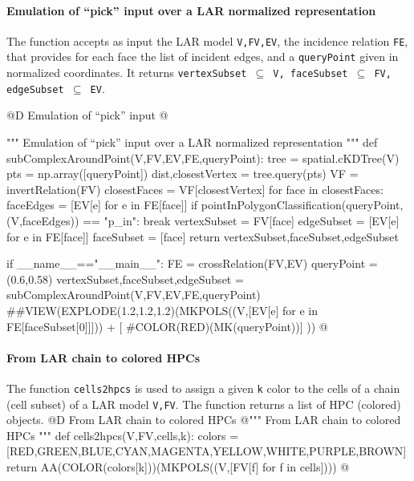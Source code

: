 \documentclass[11pt,oneside]{article}    %
\begin{document}
\paragraph{Emulation of  ``pick'' input over a LAR normalized representation}
The function accepts as input the LAR model \texttt{V,FV,EV}, the incidence relation \texttt{FE}, that provides for each face the list of incident edges, and a \texttt{queryPoint} given in normalized coordinates. It returns \texttt{vertexSubset $\subseteq$ V, faceSubset $\subseteq$ FV, edgeSubset $\subseteq$ EV}.

@D Emulation of ``pick'' input 
@{""" Emulation of  ``pick'' input over a LAR normalized representation """
def subComplexAroundPoint(V,FV,EV,FE,queryPoint):
    tree = spatial.cKDTree(V)
    pts = np.array([queryPoint])
    dist,closestVertex = tree.query(pts)
    VF = invertRelation(FV)
    closestFaces = VF[closestVertex]
    for face in closestFaces:
        faceEdges = [EV[e] for e in FE[face]]
        if pointInPolygonClassification(queryPoint, (V,faceEdges)) == "p_in":
            break
    vertexSubset = FV[face]
    edgeSubset = [EV[e] for e in FE[face]]
    faceSubset = [face]
    return vertexSubset,faceSubset,edgeSubset

if __name__=="__main__":
    FE = crossRelation(FV,EV)
    queryPoint = (0.6,0.58)
    vertexSubset,faceSubset,edgeSubset = subComplexAroundPoint(V,FV,EV,FE,queryPoint)
    ##VIEW(EXPLODE(1.2,1.2,1.2)(MKPOLS((V,[EV[e] for e in FE[faceSubset[0]]])) + [
        #COLOR(RED)(MK(queryPoint))] ))
@}



\paragraph{From LAR chain to colored HPCs}
The function \texttt{cells2hpcs} is used to assign a given \texttt{k} color to the cells of a chain (cell subset) of a LAR model \texttt{V,FV}. The function returns a list of HPC (colored) objects.
@D From LAR chain to colored HPCs
@{""" From LAR chain to colored HPCs """
def cells2hpcs(V,FV,cells,k): 
    colors = [RED,GREEN,BLUE,CYAN,MAGENTA,YELLOW,WHITE,PURPLE,BROWN]
    return AA(COLOR(colors[k]))(MKPOLS((V,[FV[f] for f in cells])))
@}
\end{document}
